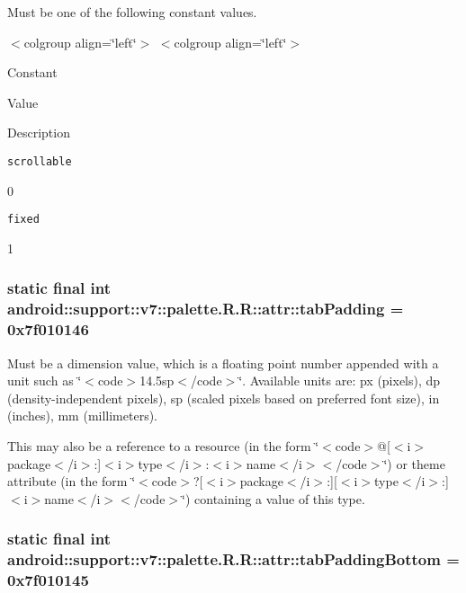 Must be one of the following constant values. \begin{TabularC}{0}
\hline
\end{TabularC}
$<$colgroup align=\char`\"{}left\char`\"{}$>$ $<$colgroup align=\char`\"{}left\char`\"{}$>$ 

Constant

Value

Description 

{\tt scrollable}

0

{\tt fixed}

1\hypertarget{classandroid_1_1support_1_1v7_1_1palette_1_1_r_1_1attr_39a7ec07351bf775742d66f2eb4baa53}{
\subsubsection[{tabPadding}]{\setlength{\rightskip}{0pt plus 5cm}static final int android::support::v7::palette.R.R::attr::tabPadding = 0x7f010146}}
\label{classandroid_1_1support_1_1v7_1_1palette_1_1_r_1_1attr_39a7ec07351bf775742d66f2eb4baa53}


Must be a dimension value, which is a floating point number appended with a unit such as \char`\"{}$<$code$>$14.5sp$<$/code$>$\char`\"{}. Available units are: px (pixels), dp (density-independent pixels), sp (scaled pixels based on preferred font size), in (inches), mm (millimeters). 

This may also be a reference to a resource (in the form \char`\"{}$<$code$>$@\mbox{[}$<$i$>$package$<$/i$>$:\mbox{]}$<$i$>$type$<$/i$>$:$<$i$>$name$<$/i$>$$<$/code$>$\char`\"{}) or theme attribute (in the form \char`\"{}$<$code$>$?\mbox{[}$<$i$>$package$<$/i$>$:\mbox{]}\mbox{[}$<$i$>$type$<$/i$>$:\mbox{]}$<$i$>$name$<$/i$>$$<$/code$>$\char`\"{}) containing a value of this type. \hypertarget{classandroid_1_1support_1_1v7_1_1palette_1_1_r_1_1attr_e878e63b667e692480ba9515a05524c8}{
\subsubsection[{tabPaddingBottom}]{\setlength{\rightskip}{0pt plus 5cm}static final int android::support::v7::palette.R.R::attr::tabPaddingBottom = 0x7f010145}}
\label{classandroid_1_1support_1_1v7_1_1palette_1_1_r_1_1attr_e878e63b667e692480ba9515a05524c8}


